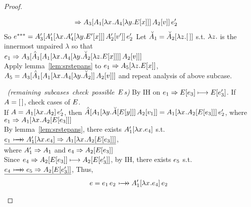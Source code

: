 \documentclass{article}
\begin{document}
\begin{proof}
\begin{byCases}
\begin{byCases}
\begin{byCases}
\begin{byCases}
\begin{align*}
            &\pstep \ap{\inA[_3]{{\ap{\inA[_1]{\lx\inA[_4]{\ly\inE{x}}}}
                                     {\Av[_2]}}}}{\e_2'}
        \end{align*}
        So $\ethree = 
        \ap{\inA[_3']{{\ap{\inA[_1']{\lx\inA[_4']{\ly\Ex[']}}}
                          {\inA[_2']{\val'}}}}}{\e_2'}$
        Let $\Am_1 = \inAm[_2]{\lz\hole}$ s.t. $\lz$ is the innermost unpaired 
        $\lambda$ so that \\
        $\e_1 \pstep 
        \inA[_3]{\inAp[_1]{{\ap{\inA[_1]{\lx\inA[_4]{\ly\inAm[_2]{\lz\inE{x}}}}}
                               {\Av[_2]}}}}$\\
        Apply lemma~\ref{lem:srstepans} to $\e_1 \pstep \inA[_5]{\lz\Ex}$,
        $\A_5 = 
        \inA[_3]{\inAp[_1]{{\ap{\inA[_1]{\lx\inA[_4]{\ly\Am_2}}}
                               {\Av[_2]}}}}$
        and repeat analysis of above subcase.
      \end{byCases}
    \end{byCases}
    \mbox{\hspace{-1cm}
          \textit{(remaining subcases check possible} $\E$\textit{s)}}
    By IH on $\e_1 \pstep \inE{\e_3} \srstep \inE{\e_3'}$.
    If $\A = \hole$, check cases of $\E$.\\
    If $\A = \ap{\inA[_1]{\lx\A_2}}{\e_2'}$, then
    $\eone = \ap{\inA[_1]{\lx\inA[_2]{\inE{\e_3}}}}{\e_2'}$, 
    where $\e_1 \pstep \inA[_1]{\lx\inA[_2]{\inE{\e_3}}}$\\
    By lemma~\ref{lem:srstepans}, there exists $\inA[_1']{\lx\e_4}$ s.t.
    $\underline{\e_1 \srsteps \inA[_1']{\lx\e_4} 
                     \pstep \inA[_1]{\lx\inA[_2]{\inE{\e_3}}}}$,\\
    where $\A_1' \pstep \A_1$ and $\e_4 \pstep \inA[_2]{\inE{\e_3}}$\\
    Since $\e_4 \pstep \inA[_2]{\inE{\e_3}} \srstep \inA[_2]{\inE{\e_3'}}$,
    by IH, there exists $\e_5$ s.t. 
    $\underline{ \e_4 \srsteps \e_5 \pstep \inA[_2]{\inE{\e_3'}} }$, Thus,
    \begin{align*}
    \e = \ap{\e_1}{\e_2} &\srsteps \ap{\inA[_1']{\lx\e_4}}{\e_2} \\

\end{align*}
\end{byCases}
\end{byCases}
\end{proof}
\end{document}
